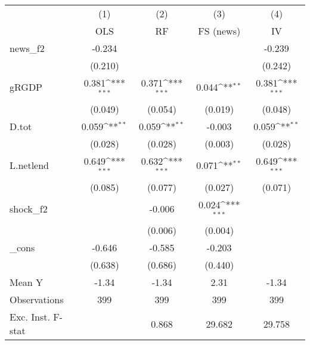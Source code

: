 {
\def\sym#1{\ifmmode^{#1}\else\(^{#1}\)\fi}
\begin{tabular}{l*{4}{c}}
\toprule
            &\multicolumn{1}{c}{(1)}&\multicolumn{1}{c}{(2)}&\multicolumn{1}{c}{(3)}&\multicolumn{1}{c}{(4)}\\
            &\multicolumn{1}{c}{OLS}&\multicolumn{1}{c}{RF}&\multicolumn{1}{c}{FS (news)}&\multicolumn{1}{c}{IV}\\
\midrule
news\_f2     &      -0.234         &                     &                     &      -0.239         \\
            &     (0.210)         &                     &                     &     (0.242)         \\
\addlinespace
gRGDP       &       0.381\sym{***}&       0.371\sym{***}&       0.044\sym{**} &       0.381\sym{***}\\
            &     (0.049)         &     (0.054)         &     (0.019)         &     (0.048)         \\
\addlinespace
D.tot       &       0.059\sym{**} &       0.059\sym{**} &      -0.003         &       0.059\sym{**} \\
            &     (0.028)         &     (0.028)         &     (0.003)         &     (0.028)         \\
\addlinespace
L.netlend   &       0.649\sym{***}&       0.632\sym{***}&       0.071\sym{**} &       0.649\sym{***}\\
            &     (0.085)         &     (0.077)         &     (0.027)         &     (0.071)         \\
\addlinespace
shock\_f2    &                     &      -0.006         &       0.024\sym{***}&                     \\
            &                     &     (0.006)         &     (0.004)         &                     \\
\addlinespace
\_cons      &      -0.646         &      -0.585         &      -0.203         &                     \\
            &     (0.638)         &     (0.686)         &     (0.440)         &                     \\
\midrule
Mean Y      &       -1.34         &       -1.34         &        2.31         &       -1.34         \\
Observations&         399         &         399         &         399         &         399         \\
Exc. Inst. F-stat&                     &       0.868         &      29.682         &      29.758         \\
\bottomrule
\end{tabular}
}
